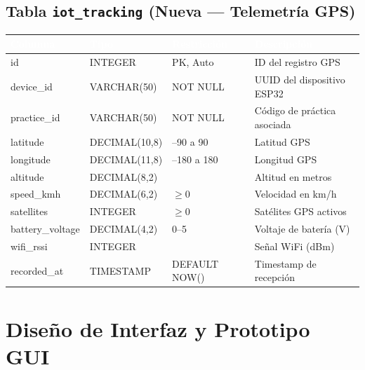 \documentclass[12pt,a4paper,twoside]{report}
\begin{document}
\section{Tabla \texttt{iot\_tracking} \textnormal{\small(Nueva — Telemetría GPS)}}
\begin{center}
\begin{tabularx}{\textwidth}{|l|l|l|X|}
\hline
\rowcolor{tableHdr}
\textcolor{white}{\textbf{Columna}} & \textcolor{white}{\textbf{Tipo}} &
\textcolor{white}{\textbf{Restricción}} & \textcolor{white}{\textbf{Descripción}} \\
\hline
\rowcolor{rowOdd}id & INTEGER & PK, Auto & ID del registro GPS \\
\hline\rowcolor{rowEven}device\_id & VARCHAR(50) & NOT NULL & UUID del dispositivo ESP32 \\
\hline\rowcolor{rowOdd}practice\_id & VARCHAR(50) & NOT NULL & Código de práctica asociada \\
\hline\rowcolor{rowEven}latitude & DECIMAL(10,8) & --90 a 90 & Latitud GPS \\
\hline\rowcolor{rowOdd}longitude & DECIMAL(11,8) & --180 a 180 & Longitud GPS \\
\hline\rowcolor{rowEven}altitude & DECIMAL(8,2) & & Altitud en metros \\
\hline\rowcolor{rowOdd}speed\_kmh & DECIMAL(6,2) & $\geq 0$ & Velocidad en km/h \\
\hline\rowcolor{rowEven}satellites & INTEGER & $\geq 0$ & Satélites GPS activos \\
\hline\rowcolor{rowOdd}battery\_voltage & DECIMAL(4,2) & 0--5 & Voltaje de batería (V) \\
\hline\rowcolor{rowEven}wifi\_rssi & INTEGER & & Señal WiFi (dBm) \\
\hline\rowcolor{rowOdd}recorded\_at & TIMESTAMP & DEFAULT NOW() & Timestamp de recepción \\
\hline
\end{tabularx}
\end{center}

\chapter{Diseño de Interfaz y Prototipo GUI}
\end{document}
